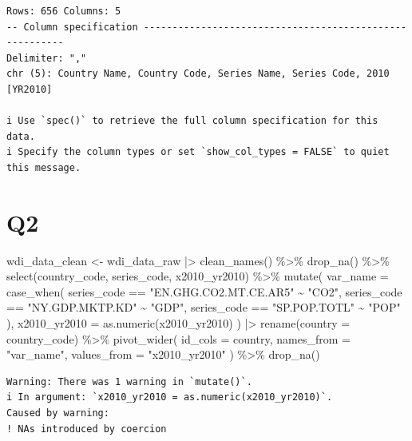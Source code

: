 \documentclass[
  letterpaper,
  DIV=11,
  numbers=noendperiod]{scrartcl}
\newenvironment{Shaded}{\begin{snugshade}}{\end{snugshade}}
\newcommand{\AttributeTok}[1]{\textcolor[rgb]{0.40,0.45,0.13}{#1}}
\newcommand{\FunctionTok}[1]{\textcolor[rgb]{0.28,0.35,0.67}{#1}}
\newcommand{\NormalTok}[1]{\textcolor[rgb]{0.00,0.23,0.31}{#1}}
\newcommand{\OtherTok}[1]{\textcolor[rgb]{0.00,0.23,0.31}{#1}}
\newcommand{\SpecialCharTok}[1]{\textcolor[rgb]{0.37,0.37,0.37}{#1}}
\newcommand{\StringTok}[1]{\textcolor[rgb]{0.13,0.47,0.30}{#1}}
\begin{document}
\begin{verbatim}
Rows: 656 Columns: 5
-- Column specification --------------------------------------------------------
Delimiter: ","
chr (5): Country Name, Country Code, Series Name, Series Code, 2010 [YR2010]

i Use `spec()` to retrieve the full column specification for this data.
i Specify the column types or set `show_col_types = FALSE` to quiet this message.
\end{verbatim}

\section{Q2}\label{q2}

\begin{Shaded}
\begin{Highlighting}[]
\NormalTok{wdi\_data\_clean }\OtherTok{\textless{}{-}} 
\NormalTok{  wdi\_data\_raw }\SpecialCharTok{|\textgreater{}}
  \FunctionTok{clean\_names}\NormalTok{() }\SpecialCharTok{\%\textgreater{}\%}
  \FunctionTok{drop\_na}\NormalTok{() }\SpecialCharTok{\%\textgreater{}\%}
  \FunctionTok{select}\NormalTok{(country\_code, series\_code, x2010\_yr2010) }\SpecialCharTok{\%\textgreater{}\%}
  \FunctionTok{mutate}\NormalTok{(}
    \AttributeTok{var\_name =} \FunctionTok{case\_when}\NormalTok{(}
\NormalTok{      series\_code }\SpecialCharTok{==} \StringTok{"EN.GHG.CO2.MT.CE.AR5"} \SpecialCharTok{\textasciitilde{}} \StringTok{"CO2"}\NormalTok{,}
\NormalTok{      series\_code }\SpecialCharTok{==} \StringTok{"NY.GDP.MKTP.KD"} \SpecialCharTok{\textasciitilde{}} \StringTok{"GDP"}\NormalTok{,}
\NormalTok{      series\_code }\SpecialCharTok{==} \StringTok{"SP.POP.TOTL"} \SpecialCharTok{\textasciitilde{}} \StringTok{"POP"}
\NormalTok{    ),}
    \AttributeTok{x2010\_yr2010 =} \FunctionTok{as.numeric}\NormalTok{(x2010\_yr2010)}
\NormalTok{  ) }\SpecialCharTok{|\textgreater{}}
    \FunctionTok{rename}\NormalTok{(}\AttributeTok{country =}\NormalTok{ country\_code) }\SpecialCharTok{\%\textgreater{}\%}
    \FunctionTok{pivot\_wider}\NormalTok{(}
      \AttributeTok{id\_cols =}\NormalTok{ country,}
      \AttributeTok{names\_from =} \StringTok{"var\_name"}\NormalTok{,}
      \AttributeTok{values\_from =} \StringTok{"x2010\_yr2010"}
\NormalTok{    ) }\SpecialCharTok{\%\textgreater{}\%}
  \FunctionTok{drop\_na}\NormalTok{()}
\end{Highlighting}
\end{Shaded}

\begin{verbatim}
Warning: There was 1 warning in `mutate()`.
i In argument: `x2010_yr2010 = as.numeric(x2010_yr2010)`.
Caused by warning:
! NAs introduced by coercion
\end{verbatim}
\end{document}
